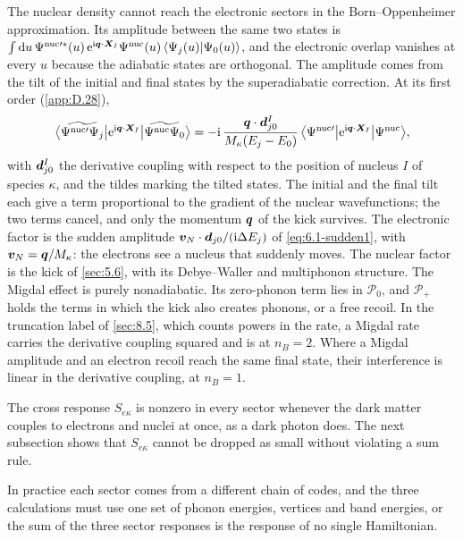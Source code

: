 The nuclear density cannot reach the electronic sectors in the Born--Oppenheimer approximation. Its amplitude between the same two states is $\int\mathrm{d} u\,\Psi^{\mathrm{nuc}\prime*}(u)\,\mathrm{e}^{\mathrm{i}\bm{q}\cdot\bm{X}_I}\Psi^{\mathrm{nuc}}(u)\,\allowbreak\langle\Psi_j(u)|\Psi_0(u)\rangle$, and the electronic overlap vanishes at every $u$ because the adiabatic states are orthogonal. The amplitude comes from the tilt of the initial and final states by the superadiabatic correction. At its first order (\cref{app:D.28}),
\begin{equation}
  \bigl\langle\widetilde{\Psi^{\mathrm{nuc}\prime}\Psi_j}\big|\mathrm{e}^{\mathrm{i}\bm{q}\cdot\bm{X}_I}\big|\widetilde{\Psi^{\mathrm{nuc}}\Psi_0}\bigr\rangle = -\mathrm{i}\,\frac{\bm{q}\cdot\bm{d}^{I}_{j0}}{M_\kappa(E_j - E_0)}\,\bigl\langle\Psi^{\mathrm{nuc}\prime}\big|\mathrm{e}^{\mathrm{i}\bm{q}\cdot\bm{X}_I}\big|\Psi^{\mathrm{nuc}}\bigr\rangle ,
  \label{eq:8.6-boost}
\end{equation}
with $\bm{d}^I_{j0}$ the derivative coupling with respect to the position of nucleus $I$ of species $\kappa$, and the tildes marking the tilted states. The initial and the final tilt each give a term proportional to the gradient of the nuclear wavefunctions; the two terms cancel, and only the momentum $\bm{q}$ of the kick survives. The electronic factor is the sudden amplitude $\bm{v}_N\cdot\bm{d}_{j0}/(\mathrm{i}\Delta E_j)$ of \cref{eq:6.1-sudden1}, with $\bm{v}_N = \bm{q}/M_\kappa$: the electrons see a nucleus that suddenly moves. The nuclear factor is the kick of \cref{sec:5.6}, with its Debye--Waller and multiphonon structure. The Migdal effect is purely nonadiabatic. Its zero-phonon term lies in $\mathcal{P}_0$, and $\mathcal{P}_+$ holds the terms in which the kick also creates phonons, or a free recoil. In the truncation label of \cref{sec:8.5}, which counts powers in the rate, a Migdal rate carries the derivative coupling squared and is at $n_B = 2$. Where a Migdal amplitude and an electron recoil reach the same final state, their interference is linear in the derivative coupling, at $n_B = 1$.

The cross response $S_{e\kappa}$ is nonzero in every sector whenever the dark matter couples to electrons and nuclei at once, as a dark photon does. The next subsection shows that $S_{e\kappa}$ cannot be dropped as small without violating a sum rule.

In practice each sector comes from a different chain of codes, and the three calculations must use one set of phonon energies, vertices and band energies, or the sum of the three sector responses is the response of no single Hamiltonian.

